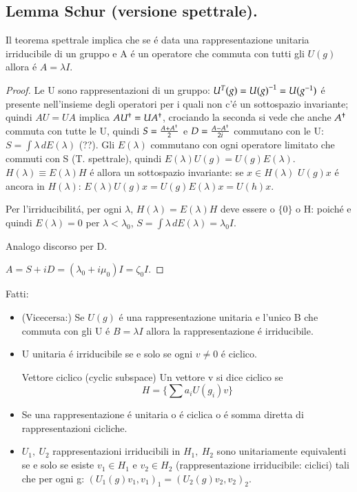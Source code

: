 \documentclass[oneside,12pt]{memoir}
\begin{document}
\subsection{Lemma Schur (versione spettrale).}

Il teorema spettrale implica che se \'e data una rappresentazione unitaria irriducibile di un gruppo e A \'e un operatore che commuta con tutti gli $U(g)$ allora \'e $A=\lambda I$.

\begin{proof}
Le U sono rappresentazioni di un gruppo: $U^T(g)={{U(g)}^{-1}}=U({{g}^{-1}})$ \'e presente nell'insieme degli operatori per i quali non c'\'e un sottospazio invariante; quindi $AU=UA$ implica $A{{U}^{\dag}}=U{{A}^{\dag}}$, crociando la seconda si vede che anche ${{A}^{\dag}}$ commuta con tutte le U, quindi $S=\frac{A+{{A}^{\dag}}}{2}$ e $D=\frac{A-{{A}^{\dag}}}{2i}$ commutano con le U: $S=\int\lambda\,dE(\lambda)$ (??). Gli $E(\lambda)$ commutano con ogni operatore limitato che commuti con S (T. spettrale), quindi $E(\lambda)U(g)=U(g)E(\lambda)$. $H(\lambda)\equiv E(\lambda)H$ \'e allora un sottospazio invariante: se $x\in H(\lambda)$ $U(g)x$ \'e ancora in $H(\lambda)$: $E(\lambda)U(g)x=U(g)E(\lambda)x=U(h)x$.

Per l'irriducibilit\'a, per ogni $\lambda$, $H(\lambda)=E(\lambda)H$ deve essere o $\{0\}$ o H: poich\'e  e quindi $E(\lambda)=0$ per $\lambda<\lambda_0$, $S=\int\lambda\,dE(\lambda)=\lambda_0I$.

Analogo discorso per D. 

$A=S+iD=(\lambda_0+i\mu_0)I=\zeta_0I$.

\end{proof}

Fatti:
\begin{itemize}
    \item (Vicecersa:) Se $U(g)$ \'e una rappresentazione unitaria e l'unico B che commuta con gli U \'e $B=\lambda I$ allora la rappresentazione \'e irriducibile.
    \item U unitaria \'e irriducibile se e solo se ogni $v\neq0$ \'e ciclico.
    
    \begin{definition}{Vettore ciclico (cyclic subspace)}
    Un vettore v si dice ciclico se
    \begin{equation*}
    H=\{\sum a_iU(g_i)v\}
    \end{equation*}
    \end{definition}
    
    \item Se una rappresentazione \'e unitaria o \'e ciclica o \'e somma diretta di rappresentazioni cicliche.
    \item $U_1,\ U_2$ rappresentazioni irriducibili in $H_1,\ H_2$ sono unitariamente equivalenti se e solo se esiste $v_1\in H_1$ e $v_2\in H_2$ (rappresentazione irriducibile: ciclici) tali che per ogni g: $(U_1(g)v_1,v_1)_1=(U_2(g)v_2,v_2)_2$.
    
\end{itemize}
\end{document}
